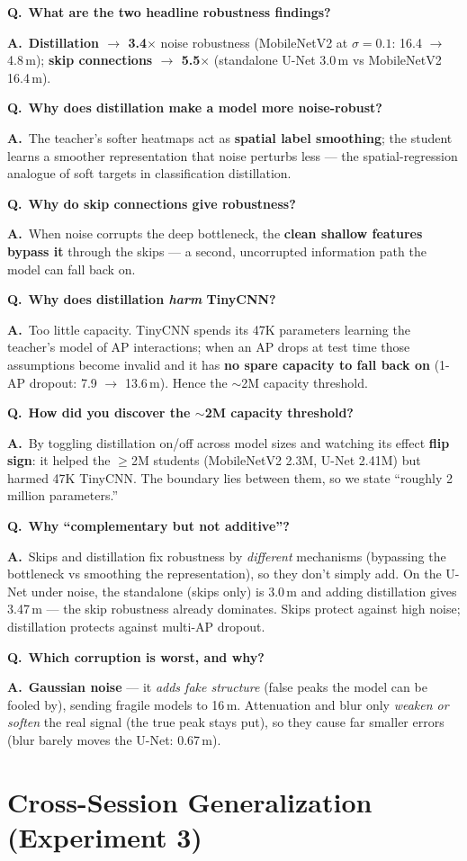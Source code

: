 \documentclass[11pt]{article}
\newcommand{\Q}[1]{\medskip\noindent\textbf{\textcolor{blue!50!black}{Q.}}\ \textbf{#1}\par\nopagebreak}
\newcommand{\A}{\noindent\textbf{A.}\ }
\begin{document}
\Q{What are the two headline robustness findings?}
\A \textbf{Distillation $\to$ 3.4$\times$} noise robustness (MobileNetV2 at $\sigma{=}0.1$: 16.4 $\to$
4.8\,m); \textbf{skip connections $\to$ 5.5$\times$} (standalone U-Net 3.0\,m vs MobileNetV2 16.4\,m).

\Q{Why does distillation make a model more noise-robust?}
\A The teacher's softer heatmaps act as \textbf{spatial label smoothing}; the student learns a smoother
representation that noise perturbs less --- the spatial-regression analogue of soft targets in
classification distillation.

\Q{Why do skip connections give robustness?}
\A When noise corrupts the deep bottleneck, the \textbf{clean shallow features bypass it} through the
skips --- a second, uncorrupted information path the model can fall back on.

\Q{Why does distillation \emph{harm} TinyCNN?}
\A Too little capacity. TinyCNN spends its 47K parameters learning the teacher's model of AP
interactions; when an AP drops at test time those assumptions become invalid and it has \textbf{no spare
capacity to fall back on} (1-AP dropout: 7.9 $\to$ 13.6\,m). Hence the $\sim$2M capacity threshold.

\Q{How did you discover the $\sim$2M capacity threshold?}
\A By toggling distillation on/off across model sizes and watching its effect \textbf{flip sign}: it
helped the $\geq$2M students (MobileNetV2 2.3M, U-Net 2.41M) but harmed 47K TinyCNN. The boundary lies
between them, so we state ``roughly 2 million parameters.''

\Q{Why ``complementary but not additive''?}
\A Skips and distillation fix robustness by \emph{different} mechanisms (bypassing the bottleneck vs
smoothing the representation), so they don't simply add. On the U-Net under noise, the standalone (skips
only) is 3.0\,m and adding distillation gives 3.47\,m --- the skip robustness already dominates. Skips
protect against high noise; distillation protects against multi-AP dropout.

\Q{Which corruption is worst, and why?}
\A \textbf{Gaussian noise} --- it \emph{adds fake structure} (false peaks the model can be fooled by),
sending fragile models to 16\,m. Attenuation and blur only \emph{weaken or soften} the real signal (the
true peak stays put), so they cause far smaller errors (blur barely moves the U-Net: 0.67\,m).

\section{Cross-Session Generalization (Experiment 3)}
\end{document}

